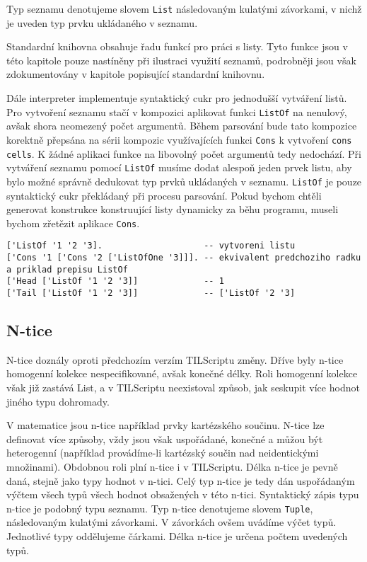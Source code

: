 Typ seznamu denotujeme slovem \lstinline{List} následovaným kulatými závorkami, v nichž je uveden
typ prvku ukládaného v seznamu.

Standardní knihovna obsahuje řadu funkcí pro práci s listy. Tyto funkce jsou v této kapitole pouze
nastíněny při ilustraci využití seznamů, podrobněji jsou však zdokumentovány v kapitole popisující
standardní knihovnu.

Dále interpreter implementuje syntaktický cukr pro jednodušší vytváření listů. Pro vytvoření
seznamu stačí v kompozici aplikovat funkci \lstinline{ListOf} na nenulový, avšak shora neomezený
počet argumentů. Během parsování bude tato kompozice korektně přepsána na sérii kompozic
využívajících funkci \lstinline{Cons} k vytvoření \lstinline{cons cells}. K žádné aplikaci funkce
na libovolný počet argumentů tedy nedochází. Při vytváření seznamu pomocí \lstinline{ListOf} musíme
dodat alespoň jeden prvek listu, aby bylo možné správně dedukovat typ prvků ukládaných v seznamu.
\lstinline{ListOf} je pouze syntaktický cukr překládaný při procesu parsování. Pokud bychom chtěli
generovat konstrukce konstruující listy dynamicky za běhu programu, museli bychom zřetězit aplikace
\lstinline{Cons}.

\begin{lstlisting}[caption={Příklad využití seznamů}]
['ListOf '1 '2 '3].                    -- vytvoreni listu
['Cons '1 ['Cons '2 ['ListOfOne '3]]]. -- ekvivalent predchoziho radku a priklad prepisu ListOf
['Head ['ListOf '1 '2 '3]]             -- 1
['Tail ['ListOf '1 '2 '3]]             -- ['ListOf '2 '3]
\end{lstlisting}

\subsection{N-tice}

N-tice doznály oproti předchozím verzím TILScriptu změny. Dříve byly n-tice homogenní kolekce
nespecifikované, avšak konečné délky. Roli homogenní kolekce však již zastává List, a v TILScriptu
neexistoval způsob, jak seskupit více hodnot jiného typu dohromady.

V matematice jsou n-tice například prvky kartézského součinu. N-tice lze definovat více způsoby,
vždy jsou však uspořádané, konečné a můžou být heterogenní (například provádíme-li kartézský součin
nad neidentickými množinami). Obdobnou roli plní n-tice i v TILScriptu. Délka n-tice je pevně daná,
stejně jako typy hodnot v n-tici. Celý typ n-tice je tedy dán uspořádaným výčtem všech typů všech
hodnot obsažených v této n-tici. Syntaktický zápis typu n-tice je podobný typu seznamu. Typ n-tice
denotujeme slovem \lstinline{Tuple}, následovaným kulatými závorkami. V závorkách ovšem uvádíme
výčet typů. Jednotlivé typy oddělujeme čárkami. Délka n-tice je určena počtem uvedených typů.

